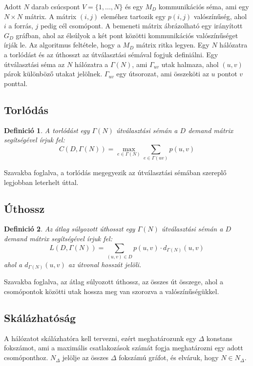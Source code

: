 \documentclass[12pt]{report}
\newtheorem{mydef}{Definició}
\begin{document}
Adott $N$ darab csúcspont  $V = \{1, ..., N\}$  és egy $M_D$ kommunikációs séma, ami egy $N\times N$ mátrix.
A mátrix $(i, j)$ eleméhez tartozik egy $p(i, j)$ valószínűség, ahol $i$ a forrás, $j$ pedig cél csomópont.
A bemeneti mátrix ábrázolható egy irányított $G_D$ gráfban, ahol az élsúlyok a két pont közötti kommunikációs valószínűséget írják le.
Az algoritmus feltétele, hogy a \(M_D\) mátrix ritka legyen.
Egy $N$ hálózatra a torlódást és az úthosszt az útválasztási sémával fogjuk definiálni.
Egy útválasztási séma az $N$ hálózatra a $\Gamma(N)$, ami $\Gamma_{uv}$ utak halmaza, ahol $(u, v)$ párok különböző utakat jelölnek.
$\Gamma_{uv}$ egy útsorozat, ami összeköti az $u$ pontot $v$ ponttal.

\subsection{Torlódás}

\begin{mydef}
	A torlódást egy \(\Gamma(N)\) útválasztási sémán a \(D\) demand mátrix segítségével írjuk fel: \[C(D, \Gamma(N)) = \max_{e \in \Gamma(N)}  \sum_{e \in \Gamma(uv)} p(u,v) \]
\end{mydef}

Szavakba foglalva, a torlódás megegyezik az útválasztási sémában szereplő legjobban leterhelt úttal.

\subsection{Úthossz}

\begin{mydef}
	Az átlag súlyozott úthosszt egy \(\Gamma(N)\) útválasztási sémán a \(D\) demand mátrix segítségével írjuk fel: \[L(D, \Gamma(N)) = \sum_{(u,v) \in D}  p(u,v)  \cdot d_{\Gamma(N)}(u, v) \] ahol a \(d_{\Gamma(N)}(u, v)\) az útvonal hosszát jelöli.
\end{mydef}

Szavakba foglalva, az átlag súlyozott úthossz, az összes út összege, ahol a csomópontok közötti utak hossza meg van szorozva a valószínűségükkel. 

\subsection{Skálázhatóság}

A hálózatot skálázhatóra kell tervezni, ezért meghatározunk egy \(\Delta\) konstans fokszámot, ami a maximális csatlakozások számát fogja meghatározni egy adott csomóponthoz.
\(N_\Delta\) jelölje az összes \(\Delta\) fokszámú gráfot, és elváruk, hogy \(N \in N_\Delta\).
\end{document}
